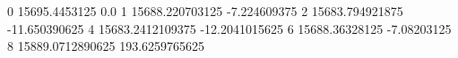 0 15695.4453125 0.0
1 15688.220703125 -7.224609375
2 15683.794921875 -11.650390625
4 15683.2412109375 -12.2041015625
6 15688.36328125 -7.08203125
8 15889.0712890625 193.6259765625
